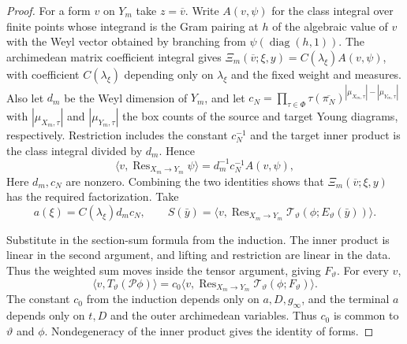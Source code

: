 \begin{proof}
For a form $v$ on $Y_m$ take $z=\overline v$. Write $A(v,\psi)$ for the class integral over finite points whose integrand is the Gram pairing at $h$ of the algebraic value of $v$ with the Weyl vector obtained by branching from $\psi(\operatorname{diag}(h,1))$. The archimedean matrix coefficient integral gives $\Xi_m(\overline v;\xi,y)=C(\lambda_\xi)A(v,\psi)$, with coefficient $C(\lambda_\xi)$ depending only on $\lambda_\xi$ and the fixed weight and measures. Also let $d_m$ be the Weyl dimension of $Y_m$, and let $c_N=\prod_{\tau\in\Phi}\tau(\overline{\pi_N})^{|\mu_{X_m,\tau}|-|\mu_{Y_m,\tau}|}$ with $|\mu_{X_m,\tau}|$ and $|\mu_{Y_m,\tau}|$ the box counts of the source and target Young diagrams, respectively. Restriction includes the constant $c_N^{-1}$ and the target inner product is the class integral divided by $d_m$. Hence
\[
 \big\langle v,\operatorname{Res}_{X_m\to Y_m}\psi\big\rangle
  =d_m^{-1}c_N^{-1}A(v,\psi),
\]
Here $d_m,c_N$ are nonzero. Combining the two identities shows that $\Xi_m(\overline v;\xi,y)$ has the required factorization. Take
\[
 a(\xi)=C(\lambda_\xi)d_mc_N,\qquad
 S(\bar y)=
 \big\langle v,\operatorname{Res}_{X_m\to Y_m}
                 \mathcal T_\vartheta(\phi;E_\vartheta(\bar y))\big\rangle .
\]

Substitute in the section-sum formula from the induction. The inner product is linear in the second argument, and lifting and restriction are linear in the data. Thus the weighted sum moves inside the tensor argument, giving $F_\vartheta$. For every $v$,
\[
 \big\langle v,T_\vartheta(\mathcal P\phi)\big\rangle
 =c_0\big\langle v,\operatorname{Res}_{X_m\to Y_m}
                          \mathcal T_\vartheta(\phi;F_\vartheta)\big\rangle.
\]
The constant $c_0$ from the induction depends only on $a,D,g_\infty$, and the terminal $a$ depends only on $t,D$ and the outer archimedean variables. Thus $c_0$ is common to $\vartheta$ and $\phi$. Nondegeneracy of the inner product gives the identity of forms.
\end{proof}

